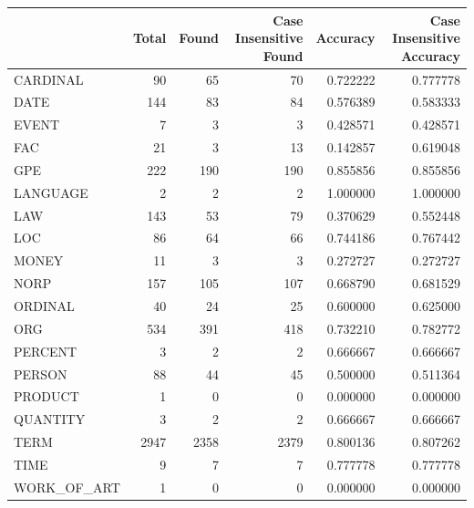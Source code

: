 \begin{tabular}{lrrrrr}
\toprule
 & Total & Found & Case Insensitive Found & Accuracy & Case Insensitive Accuracy \\
\midrule
CARDINAL & 90 & 65 & 70 & 0.722222 & 0.777778 \\
DATE & 144 & 83 & 84 & 0.576389 & 0.583333 \\
EVENT & 7 & 3 & 3 & 0.428571 & 0.428571 \\
FAC & 21 & 3 & 13 & 0.142857 & 0.619048 \\
GPE & 222 & 190 & 190 & 0.855856 & 0.855856 \\
LANGUAGE & 2 & 2 & 2 & 1.000000 & 1.000000 \\
LAW & 143 & 53 & 79 & 0.370629 & 0.552448 \\
LOC & 86 & 64 & 66 & 0.744186 & 0.767442 \\
MONEY & 11 & 3 & 3 & 0.272727 & 0.272727 \\
NORP & 157 & 105 & 107 & 0.668790 & 0.681529 \\
ORDINAL & 40 & 24 & 25 & 0.600000 & 0.625000 \\
ORG & 534 & 391 & 418 & 0.732210 & 0.782772 \\
PERCENT & 3 & 2 & 2 & 0.666667 & 0.666667 \\
PERSON & 88 & 44 & 45 & 0.500000 & 0.511364 \\
PRODUCT & 1 & 0 & 0 & 0.000000 & 0.000000 \\
QUANTITY & 3 & 2 & 2 & 0.666667 & 0.666667 \\
TERM & 2947 & 2358 & 2379 & 0.800136 & 0.807262 \\
TIME & 9 & 7 & 7 & 0.777778 & 0.777778 \\
WORK_OF_ART & 1 & 0 & 0 & 0.000000 & 0.000000 \\
\bottomrule
\end{tabular}
